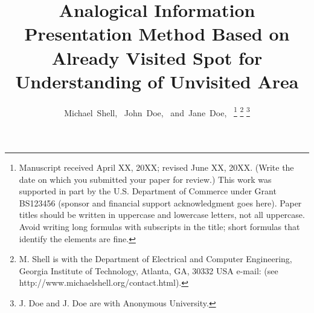 \documentclass[journal]{IAENGtran}
\begin{document}
%
\title{Analogical Information Presentation Method Based on Already Visited Spot for Understanding of Unvisited Area}
%
%
%

\author{Michael~Shell,~
        John~Doe,~
        and~Jane~Doe,~%
\thanks{Manuscript received April XX, 20XX; revised June XX, 20XX. (Write the date on
which you submitted your paper for review.) This work was supported
in part by the U.S. Department of Commerce under Grant BS123456
(sponsor and financial support acknowledgment goes here). Paper
titles should be written in uppercase and lowercase letters, not all
uppercase. Avoid writing long formulas with subscripts in the title;
short formulas that identify the elements are fine.}
\thanks{M. Shell is with the Department
of Electrical and Computer Engineering, Georgia Institute of
Technology, Atlanta,
GA, 30332 USA e-mail: (see http://www.michaelshell.org/contact.html).}%
\thanks{J. Doe and J. Doe are with Anonymous University.}}%


\maketitle

\pagestyle{empty}
\thispagestyle{empty}
\end{document}
